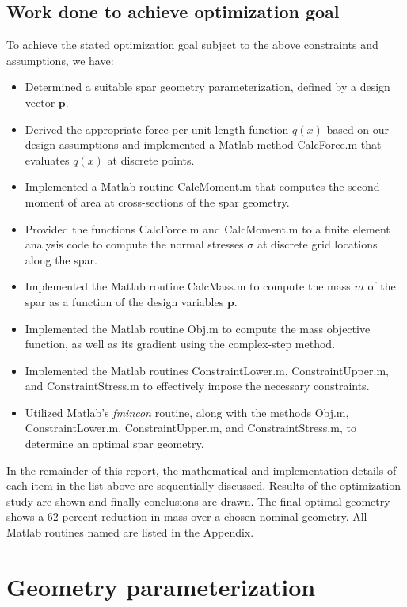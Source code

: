 \documentclass[11pt]{article}
\newcommand{\bs}[1] {\boldsymbol{#1}}
\begin{document}
\subsection{Work done to achieve optimization goal}

To achieve the stated optimization goal subject to the above
constraints and assumptions, we have:
\begin{itemize}
\item Determined a suitable spar geometry parameterization,
defined by a design vector $\bs{p}$.
\item Derived the appropriate force per unit length function
$q(x)$ based on our design assumptions and implemented a Matlab
method CalcForce.m that evaluates $q(x)$ at discrete points.
\item Implemented a Matlab routine CalcMoment.m that computes
the second moment of area at cross-sections of the spar geometry.
\item Provided the functions CalcForce.m and CalcMoment.m to a
finite element analysis code to compute the normal stresses
$\sigma$ at discrete grid locations along the spar.
\item Implemented the Matlab routine CalcMass.m to compute
the mass $m$ of the spar as a function of the design variables
$\bs{p}$.
\item Implemented the Matlab routine Obj.m to compute the
mass objective function, as well as its gradient using
the complex-step method.
\item Implemented the Matlab routines ConstraintLower.m,
ConstraintUpper.m, and ConstraintStress.m to effectively
impose the necessary constraints.
\item Utilized Matlab's \emph{fmincon} routine, along with the methods
Obj.m, ConstraintLower.m, ConstraintUpper.m, and ConstraintStress.m,
to determine an optimal spar geometry.
\end{itemize}

In the remainder of this report, the mathematical and
implementation details of each item
in the list above are sequentially discussed.
Results of the optimization study are shown and finally
conclusions are drawn. The final optimal geometry shows a
$62$ percent reduction in mass over a chosen nominal
geometry. All Matlab routines named are listed
in the Appendix.

\section{Geometry parameterization}
\end{document}
